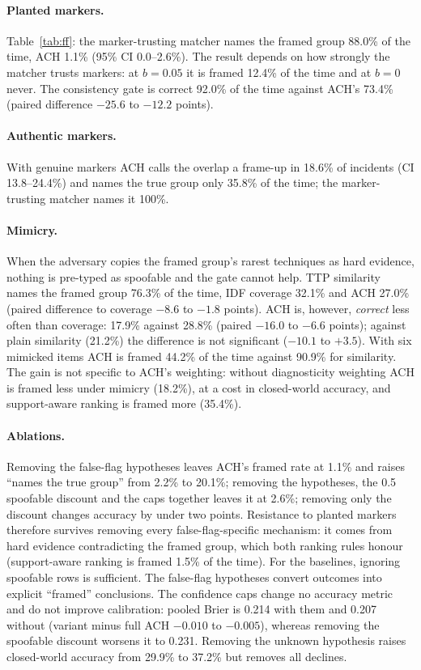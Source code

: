 \documentclass[11pt]{article}
\begin{document}
\paragraph{Planted markers.} Table~\ref{tab:ff}: the marker-trusting matcher
names the framed group 88.0\% of the time, ACH 1.1\% (95\% CI 0.0--2.6\%). The
result depends on how strongly the matcher trusts markers: at $b=0.05$ it is
framed 12.4\% of the time and at $b=0$ never. The consistency gate is correct
92.0\% of the time against ACH's 73.4\% (paired difference $-25.6$ to $-12.2$
points).
\paragraph{Authentic markers.} With genuine markers ACH calls the overlap a
frame-up in 18.6\% of incidents (CI 13.8--24.4\%) and names the true group only
35.8\% of the time; the marker-trusting matcher names it 100\%.
\paragraph{Mimicry.} When the adversary copies the framed group's rarest
techniques as hard evidence, nothing is pre-typed as spoofable and the gate
cannot help. TTP similarity names the framed group 76.3\% of the time, IDF
coverage 32.1\% and ACH 27.0\% (paired difference to coverage $-8.6$ to
$-1.8$ points). ACH is, however, \emph{correct} less often than coverage:
17.9\% against 28.8\% (paired $-16.0$ to $-6.6$ points); against plain
similarity (21.2\%) the difference is not significant ($-10.1$ to $+3.5$).
With six mimicked items ACH is framed 44.2\% of the time against 90.9\% for
similarity. The gain is not specific to ACH's weighting: without diagnosticity
weighting ACH is framed less under mimicry (18.2\%), at a cost in closed-world
accuracy, and support-aware ranking is framed more (35.4\%).
\paragraph{Ablations.} Removing the false-flag hypotheses leaves ACH's framed
rate at 1.1\% and raises ``names the true group'' from 2.2\% to 20.1\%;
removing the hypotheses, the 0.5 spoofable discount and the caps together
leaves it at 2.6\%; removing only the discount changes accuracy by under two
points. Resistance to planted markers therefore survives removing every
false-flag-specific mechanism: it comes from hard evidence contradicting the
framed group, which both ranking rules honour (support-aware ranking is framed
1.5\% of the time). For the baselines, ignoring spoofable rows is sufficient.
The false-flag hypotheses convert outcomes into explicit ``framed''
conclusions. The confidence caps change no accuracy metric and do not improve
calibration: pooled Brier is 0.214 with them and 0.207 without (variant minus
full ACH $-0.010$ to $-0.005$), whereas removing the spoofable discount
worsens it to 0.231. Removing the unknown hypothesis raises closed-world
accuracy from 29.9\% to 37.2\% but removes all declines.
\end{document}
